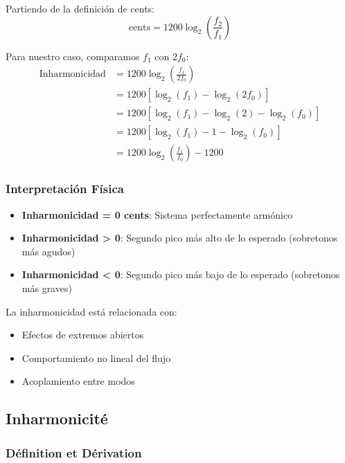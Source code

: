 \documentclass[12pt,a4paper,twocolumn]{article}
\newcommand{\freqzero}{f_0}
\newcommand{\freqone}{f_1}
\begin{document}
Partiendo de la definición de cents:
\begin{equation}
\text{cents} = 1200 \log_2\left(\frac{f_2}{f_1}\right)
\end{equation}

Para nuestro caso, comparamos $\freqone$ con $2\freqzero$:
\begin{align}
\text{Inharmonicidad} &= 1200 \log_2\left(\frac{\freqone}{2\freqzero}\right) \\
&= 1200 \left[\log_2(\freqone) - \log_2(2\freqzero)\right] \\
&= 1200 \left[\log_2(\freqone) - \log_2(2) - \log_2(\freqzero)\right] \\
&= 1200 \left[\log_2(\freqone) - 1 - \log_2(\freqzero)\right] \\
&= 1200 \log_2\left(\frac{\freqone}{\freqzero}\right) - 1200
\end{align}

\subsubsection{Interpretación Física}

\begin{itemize}
    \item \textbf{Inharmonicidad = 0 cents}: Sistema perfectamente armónico
    \item \textbf{Inharmonicidad > 0}: Segundo pico más alto de lo esperado (sobretonos más agudos)
    \item \textbf{Inharmonicidad < 0}: Segundo pico más bajo de lo esperado (sobretonos más graves)
\end{itemize}

La inharmonicidad está relacionada con:
\begin{itemize}
    \item Efectos de extremos abiertos
    \item Comportamiento no lineal del flujo
    \item Acoplamiento entre modos
\end{itemize}

\subsection{Inharmonicité}

\subsubsection{Définition et Dérivation}
\end{document}
